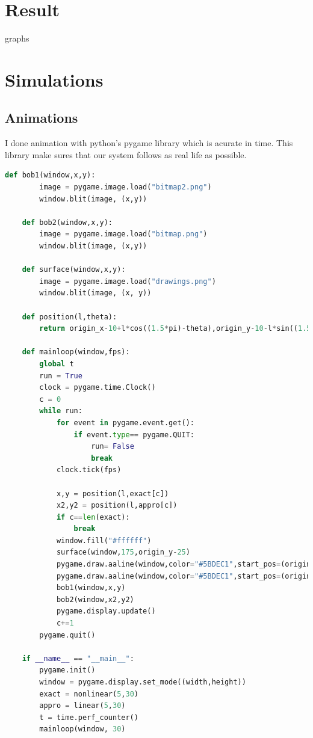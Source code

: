 \documentclass[11pt,a4paper]{article}
\begin{document}
\section{Result}
\label{sec:orgb201a18}

graphs



\section{Simulations}
\label{sec:org2864150}



\subsection{Animations}
\label{sec:orge05b339}
I done animation with python's pygame library which is acurate in time. This library make sures that our system follows as real life as possible.

\begin{lstlisting}[language=Python]
    def bob1(window,x,y):
        image = pygame.image.load("bitmap2.png")
        window.blit(image, (x,y))

    def bob2(window,x,y):
        image = pygame.image.load("bitmap.png")
        window.blit(image, (x,y))

    def surface(window,x,y):
        image = pygame.image.load("drawings.png")
        window.blit(image, (x, y))
    
    def position(l,theta):
        return origin_x-10+l*cos((1.5*pi)-theta),origin_y-10-l*sin((1.5*pi)-theta)
    
    def mainloop(window,fps):
        global t
        run = True
        clock = pygame.time.Clock()
        c = 0
        while run:
            for event in pygame.event.get():
                if event.type== pygame.QUIT:
                    run= False
                    break
            clock.tick(fps)

            x,y = position(l,exact[c])
            x2,y2 = position(l,appro[c])
            if c==len(exact):
                break
            window.fill("#ffffff")
            surface(window,175,origin_y-25)
            pygame.draw.aaline(window,color="#5BDEC1",start_pos=(origin_x,origin_y),end_pos=(x+radius,y+radius))
            pygame.draw.aaline(window,color="#5BDEC1",start_pos=(origin_x,origin_y),end_pos=(x2+10,y2+10))
            bob1(window,x,y)
            bob2(window,x2,y2)
            pygame.display.update()
            c+=1
        pygame.quit()

    if __name__ == "__main__":
        pygame.init()
        window = pygame.display.set_mode((width,height))
        exact = nonlinear(5,30)
        appro = linear(5,30)
        t = time.perf_counter()
        mainloop(window, 30)
\end{lstlisting}
\end{document}
